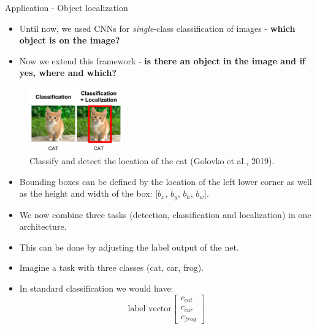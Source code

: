                 \begin{vbframe}{Application - Object localization}
            \begin{itemize}
            \item Until now, we used CNNs for \textit{single}-class classification of images - \textbf{which object is on the image?}
            \item Now we extend this framework - \textbf{is there an object in the image and if yes, where and which?}
            \end{itemize}
            \begin{figure}
            \centering
            \includegraphics[width=4cm]{figure/localize_cat.png}
            \caption{Classify and detect the location of the cat (Golovko et al., 2019).}
            \end{figure}
            \framebreak
            \begin{itemize}
            \item Bounding boxes can be defined by the location of the left lower corner as well as the height and width of the box: [$b_x$, $b_y$, $b_h$, $b_w$].
            \item We now combine three tasks (detection, classification and localization) in one architecture.
            \item This can be done by adjusting the label output of the net.
            \item Imagine a task with three classes (cat, car, frog).
            \item In standard classification we would have: 
                $$
                \text{label vector}
            \begin{bmatrix}
            c_{cat}\\
            c_{car} \\
            c_{frog}
            \end{bmatrix}
$$
\end{itemize}
\end{vbframe}
